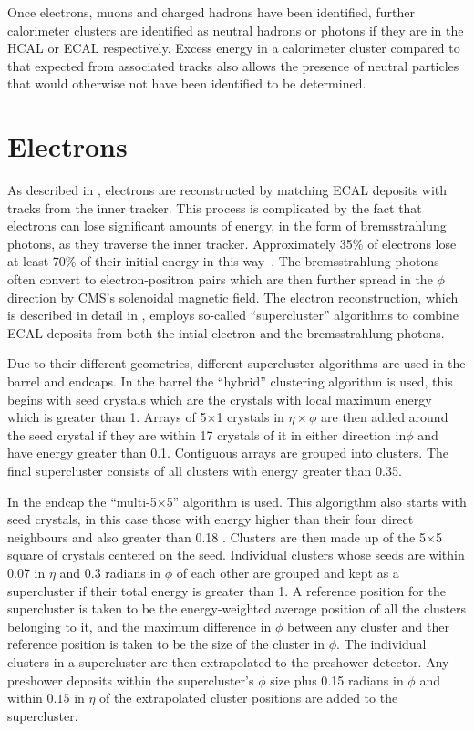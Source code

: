 Once electrons, muons and charged hadrons have been identified, further calorimeter clusters are identified as neutral hadrons or photons if they are in the \ac{HCAL} or \ac{ECAL} respectively. Excess energy in a calorimeter cluster compared to that expected from associated tracks also allows the presence of neutral particles that would otherwise not have been identified to be determined.

\section{Electrons}
\label{sec:electrons}
As described in , electrons are reconstructed by matching \ac{ECAL} deposits with tracks from the inner tracker. This process is complicated by the fact that electrons can lose significant amounts of energy, in the form of bremsstrahlung photons, as they traverse the inner tracker. Approximately 35\% of electrons lose at least 70\% of their initial energy in this way~\cite{Baffioni:2006cd}. The bremsstrahlung photons often convert to electron-positron pairs which are then further spread in the $\phi$ direction by CMS's solenoidal magnetic field. The electron reconstruction, which is described in detail in , employs so-called ``supercluster'' algorithms to combine \ac{ECAL} deposits from both the intial electron and the bremsstrahlung photons.

Due to their different geometries, different supercluster algorithms are used in the barrel and endcaps. In the barrel the ``hybrid'' clustering algorithm is used, this begins with seed crystals which are the crystals with local maximum energy which is greater than 1\GeV. Arrays of 5$\times$1 crystals in $\eta\times\phi$ are then added around the seed crystal if they are within 17 crystals of it in either direction in$\phi$ and have energy greater than 0.1\GeV. Contiguous arrays are grouped into clusters. The final supercluster consists of all clusters with energy greater than 0.35\GeV.

In the endcap the ``multi-5$\times$5'' algorithm is used. This algorigthm also starts with seed crystals, in this case those with energy higher than their four direct neighbours and also greater than 0.18 \GeV. Clusters are then made up of the 5$\times$5 square of crystals centered on the seed. Individual clusters whose seeds are within 0.07 in $\eta$ and 0.3 radians in $\phi$ of each other are grouped and kept as a supercluster if their total energy is greater than 1\GeV. A reference position for the supercluster is taken to be the energy-weighted average position of all the clusters belonging to it, and the maximum difference in $\phi$ between any cluster and ther reference position is taken to be the size of the cluster in $\phi$. The individual clusters in a supercluster are then extrapolated to the preshower detector. Any preshower deposits within the supercluster's $\phi$ size plus 0.15 radians in $\phi$ and within $0.15$ in $\eta$ of the extrapolated cluster positions are added to the supercluster.

